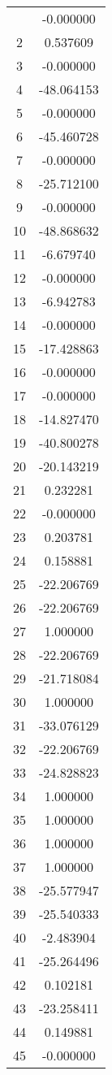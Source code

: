 \documentclass[12pt]{article}
\begin{document}
\begin{longtable}{@{}cc@{}}
\bottomrule
\endlastfoot
1 & -0.000000 \\
2 & 0.537609 \\
3 & -0.000000 \\
4 & -48.064153 \\
5 & -0.000000 \\
6 & -45.460728 \\
7 & -0.000000 \\
8 & -25.712100 \\
9 & -0.000000 \\
10 & -48.868632 \\
11 & -6.679740 \\
12 & -0.000000 \\
13 & -6.942783 \\
14 & -0.000000 \\
15 & -17.428863 \\
16 & -0.000000 \\
17 & -0.000000 \\
18 & -14.827470 \\
19 & -40.800278 \\
20 & -20.143219 \\
21 & 0.232281 \\
22 & -0.000000 \\
23 & 0.203781 \\
24 & 0.158881 \\
25 & -22.206769 \\
26 & -22.206769 \\
27 & 1.000000 \\
28 & -22.206769 \\
29 & -21.718084 \\
30 & 1.000000 \\
31 & -33.076129 \\
32 & -22.206769 \\
33 & -24.828823 \\
34 & 1.000000 \\
35 & 1.000000 \\
36 & 1.000000 \\
37 & 1.000000 \\
38 & -25.577947 \\
39 & -25.540333 \\
40 & -2.483904 \\
41 & -25.264496 \\
42 & 0.102181 \\
43 & -23.258411 \\
44 & 0.149881 \\
45 & -0.000000 \\

\end{longtable}
\end{document}
